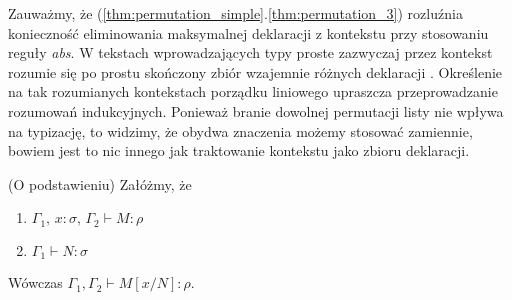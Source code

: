 \begin{uwaga*}
  Zauważmy, że (\ref{thm:permutation_simple}.\ref{thm:permutation_3}) rozluźnia konieczność eliminowania maksymalnej deklaracji z kontekstu przy stosowaniu reguły \emph{abs}. W tekstach wprowadzających typy proste zazwyczaj przez kontekst rozumie się po prostu skończony zbiór wzajemnie różnych deklaracji \cite{Barendregt_1992, Urzyczyn2006, Hindley:2008:LCI:1388400}. Określenie na tak rozumianych kontekstach porządku liniowego upraszcza przeprowadzanie rozumowań indukcyjnych. Ponieważ branie dowolnej permutacji listy nie wpływa na typizację, to widzimy, że obydwa znaczenia możemy stosować zamiennie, bowiem jest to nic innego jak traktowanie kontekstu jako zbioru deklaracji. 
\end{uwaga*}

\begin{lemat}(O podstawieniu)\label{thm:substitution}
  Załóżmy, że
  \begin{enumerate}[label=(\alph*)]
    \setlength\itemsep{0em}
    \item \(\Gamma_1,\,x:\sigma,\,\Gamma_2\vdash M:\rho\) 
    \item \(\Gamma_1\vdash N:\sigma\)
  \end{enumerate}
  Wówczas \(\Gamma_1,\Gamma_2 \vdash M[x/N]:\rho\).
\end{lemat}
